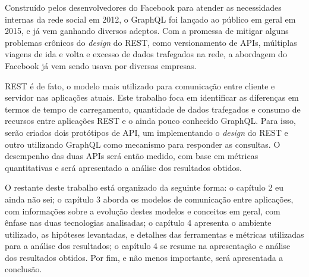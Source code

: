 Construído pelos desenvolvedores do Facebook para atender as necessidades internas da rede social em 2012, o GraphQL foi lançado ao público em geral em 2015, e já vem ganhando diversos adeptos. Com a promessa de mitigar alguns problemas crônicos do \textit{design} do REST, como versionamento de APIs, múltiplas viagens de ida e volta e excesso de dados trafegados na rede, a abordagem do Facebook já vem sendo usava por diversas empresas.

REST é de fato, o modelo mais utilizado para comunicação entre cliente e servidor nas aplicações atuais. Este trabalho foca em identificar as diferenças em termos de tempo de carregamento, quantidade de dados trafegados e consumo de recursos entre aplicações REST e o ainda pouco conhecido GraphQL. Para isso, serão criados dois protótipos de API, um implementando o \textit{design} do REST e outro utilizando GraphQL como mecanismo para responder as consultas. O desempenho das duas APIs será então medido, com base em métricas quantitativas e será apresentado a análise dos resultados obtidos.

O restante deste trabalho está organizado da seguinte forma: o capítulo 2 eu ainda não sei; o capítulo 3 aborda os modelos de comunicação entre aplicações, com informações sobre a evolução destes modelos e conceitos em geral, com ênfase nas duas tecnologias analisadas; o capítulo 4 apresenta o ambiente utilizado, as hipóteses levantadas, e detalhes das ferramentas e métricas utilizadas para a análise dos resultados; o capítulo 4 se resume na apresentação e análise dos resultados obtidos. Por fim, e não menos importante, será apresentada a conclusão.